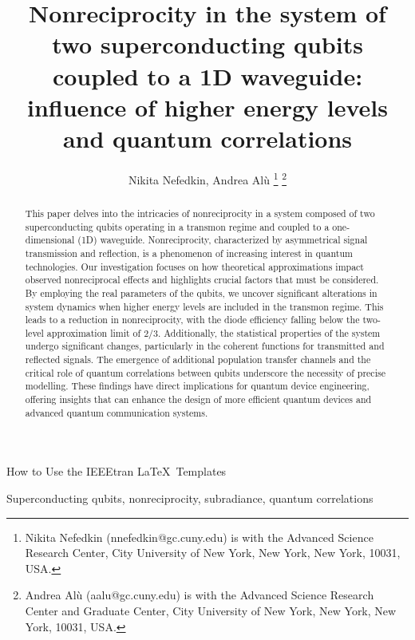 \documentclass[lettersize,journal]{IEEEtran}
\begin{document}
\title{Nonreciprocity in the system of two superconducting qubits coupled to a 1D waveguide: influence of higher energy levels and quantum correlations}
\author{Nikita Nefedkin, Andrea Al{\`u} 
\thanks{Nikita Nefedkin (nnefedkin@gc.cuny.edu) is with the Advanced Science Research Center, City University of New York, New York, New York, 10031, USA.}
\thanks{Andrea Al\`u (aalu@gc.cuny.edu) is with the Advanced Science Research Center and Graduate Center, City University of New York, New York, New York, 10031, USA.}}

%
{How to Use the IEEEtran \LaTeX \ Templates}

\maketitle

\begin{abstract}
This paper delves into the intricacies of nonreciprocity in a system composed of two superconducting qubits operating in a transmon regime and coupled to a one-dimensional (1D) waveguide. Nonreciprocity, characterized by asymmetrical signal transmission and reflection, is a phenomenon of increasing interest in quantum technologies. Our investigation focuses on how theoretical approximations impact observed nonreciprocal effects and highlights crucial factors that must be considered. By employing the real parameters of the qubits, we uncover significant alterations in system dynamics when higher energy levels are included in the transmon regime. This leads to a reduction in nonreciprocity, with the diode efficiency falling below the two-level approximation limit of $2/3$. Additionally, the statistical properties of the system undergo significant changes, particularly in the coherent functions for transmitted and reflected signals. The emergence of additional population transfer channels and the critical role of quantum correlations between qubits underscore the necessity of precise modelling. These findings have direct implications for quantum device engineering, offering insights that can enhance the design of more efficient quantum devices and advanced quantum communication systems.
\end{abstract}

\begin{IEEEkeywords}
Superconducting qubits, nonreciprocity, subradiance, quantum correlations
\end{IEEEkeywords}
\end{document}
